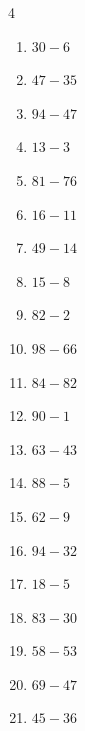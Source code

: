 \begin{multicols}{4}
\begin{enumerate}
  \item $30-6$
        \phantom{$=24$}

  \item $47-35$
        \phantom{$=12$}

  \item $94-47$
        \phantom{$=47$}

  \item $13-3$
        \phantom{$=10$}

  \item $81-76$
        \phantom{$=5$}

  \item $16-11$
        \phantom{$=5$}

  \item $49-14$
        \phantom{$=35$}

  \item $15-8$
        \phantom{$=7$}

  \item $82-2$
        \phantom{$=80$}

  \item $98-66$
        \phantom{$=32$}

  \item $84-82$
        \phantom{$=2$}

  \item $90-1$
        \phantom{$=89$}

  \item $63-43$
        \phantom{$=20$}

\columnbreak %

\resetques

  \item $88-5$
        \phantom{$=83$}

  \item $62-9$
        \phantom{$=53$}

  \item $94-32$
        \phantom{$=62$}

  \item $18-5$
        \phantom{$=13$}

  \item $83-30$
        \phantom{$=53$}

  \item $58-53$
        \phantom{$=5$}

  \item $69-47$
        \phantom{$=22$}

  \item $45-36$
        \phantom{$=9$}


\end{enumerate}
\end{multicols}
